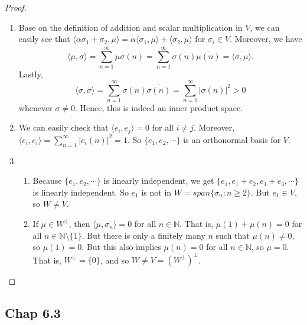 \documentclass[12pt, a4paper]{article}
\theoremstyle{plain}
\newcommand{\N}{\mathbb{N}}
\begin{document}
	\begin{proof}
	\hfill
	\begin{enumerate}[label=(\alph*)]
	\item Base on the definition of addition and scalar multiplication in $V$, we can easily see that $\langle{\alpha\sigma_1+\sigma_2,\mu}\rangle=\alpha\langle{\sigma_1,\mu}\rangle+\langle{\sigma_2,\mu}\rangle$ for $\sigma_i\in V$. Moreover, we have
	\[
	\langle{\mu,\sigma}\rangle = \sum_{n=1}^{\infty}{\mu\overline{\sigma(n)}} =\overline{\sum_{n=1}^{\infty}{\sigma(n)\overline{\mu(n)}}}=\overline{\langle{\sigma,\mu}\rangle}.
	\]
	Lastly, 
	\[
	\langle{\sigma,\sigma}\rangle=\sum_{n=1}^{\infty}{\sigma(n)\overline{\sigma(n)}}=\sum_{n=1}^{\infty}{|\sigma(n)|^2}>0
	\]
	whenever $\sigma\neq 0$. Hence, this is indeed an inner product space.
	\item We can easily check that $\langle{e_i,e_j}\rangle =0$ for all $i\neq j$. Moreover, $\langle{e_i,e_i}\rangle = \sum_{n=1}^{\infty}{|e_i(n)|^2} = 1$. So $\{e_1,e_2,\cdots\}$ is an orthonormal basis for $V$.
	\item
	\hfill
	\begin{enumerate}[label=(\roman*)]
	\item Because $\{e_1,e_2,\cdots\}$ is linearly independent, we get $\{e_1,e_1+e_2,e_1+e_3,\cdots\}$ is linearly independent. So $e_1$ is not in $W=span\{\sigma_n:n\geq 2\}$. But $e_1\in V$, so $W\neq V$.
	\item If $\mu\in W^\perp$, then $\langle{\mu,\sigma_n}\rangle =0$ for all $n\in \N$. That is, $\mu(1)+\mu(n)=0$ for all $n\in\N\setminus\{1\}$. But there is only a finitely many $n$ such that $\mu(n)\neq 0$, so $\mu(1)=0$. But this also implies $\mu(n)=0$ for all $n\in \N$, so $\mu=0$. That is, $W^\perp =\{0\}$, and so $W\neq V=(W^\perp)^\perp$.
	\end{enumerate}
	\end{enumerate}
	\end{proof}
	
\subsection*{Chap 6.3}
\end{document}
